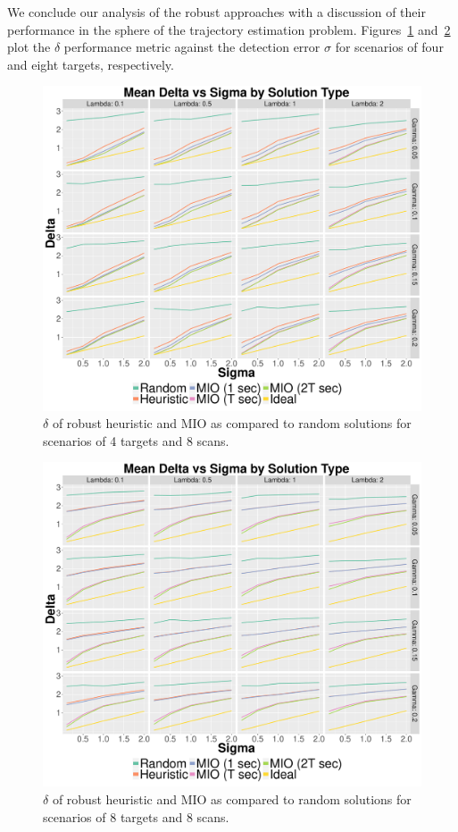 We conclude our analysis of the robust approaches with a discussion of their performance in the sphere of the trajectory estimation problem. Figures~\ref{fig:Robust_4_8_Delta} and~\ref{fig:Robust_8_8_Delta} plot the $\delta$ performance metric against the detection error $\sigma$ for scenarios of four and eight targets, respectively. 
\begin{figure}[ht]
  \centering
  \includegraphics[width=\columnwidth]{../Figures/4_8_Delta}
  \caption{$\delta$ of robust heuristic and MIO as compared to random solutions for scenarios of 4 targets and 8 scans.}
  \label{fig:Robust_4_8_Delta}
\end{figure}
\begin{figure}[ht]
  \centering
  \includegraphics[width=\columnwidth]{../Figures/8_8_Delta}
  \caption{$\delta$ of robust heuristic and MIO as compared to random solutions for scenarios of 8 targets and 8 scans.}
  \label{fig:Robust_8_8_Delta}
\end{figure}

